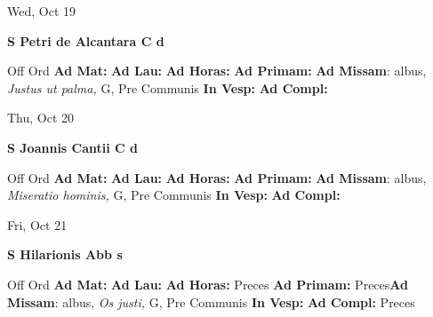 \documentclass[10pt]{memoir}
\begin{document}
\begin{center}
\begin{minipage}{3.5in}
\vspace{2em}
\begin{center}Wed, Oct 19
\end{center}
\textbf{ \large S Petri de Alcantara C
\textnormal{\normalsize d}}

\begin{justify}Off Ord
\textbf{Ad Mat: }
\textbf{Ad Lau: }
\textbf{Ad Horas: }
\textbf{Ad Primam: }\textbf{Ad Missam}: albus, \textit{Justus ut palma,} G, Pre Communis
\textbf{In Vesp: }
\textbf{Ad Compl: }
\end{justify}
\end{minipage}
\end{center}

\begin{center}
\begin{minipage}{3.5in}
\vspace{2em}
\begin{center}Thu, Oct 20
\end{center}
\textbf{ \large S Joannis Cantii C
\textnormal{\normalsize d}}

\begin{justify}Off Ord
\textbf{Ad Mat: }
\textbf{Ad Lau: }
\textbf{Ad Horas: }
\textbf{Ad Primam: }\textbf{Ad Missam}: albus, \textit{Miseratio hominis,} G, Pre Communis
\textbf{In Vesp: }
\textbf{Ad Compl: }
\end{justify}
\end{minipage}
\end{center}

\begin{center}
\begin{minipage}{3.5in}
\vspace{2em}
\begin{center}Fri, Oct 21
\end{center}
\textbf{ \large S Hilarionis Abb
\textnormal{\normalsize s}}

\begin{justify}Off Ord
\textbf{Ad Mat: }
\textbf{Ad Lau: }
\textbf{Ad Horas: }Preces
\textbf{Ad Primam: }Preces\textbf{Ad Missam}: albus, \textit{Os justi,} G, Pre Communis
\textbf{In Vesp: }
\textbf{Ad Compl: }Preces
\end{justify}
\end{minipage}
\end{center}
\end{document}
